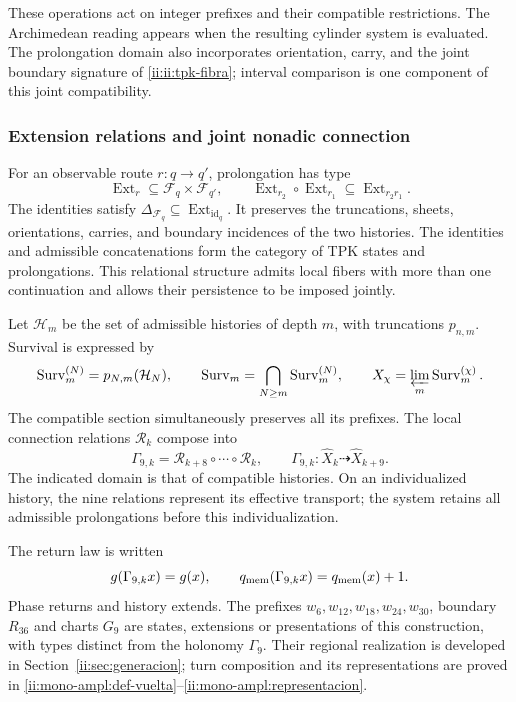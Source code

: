 These operations act on integer prefixes and their compatible
restrictions. The Archimedean reading appears when the resulting
cylinder system is evaluated. The prolongation domain also incorporates
orientation, carry, and the joint boundary signature of
\eqref{ii:ii:tpk-fibra}; interval comparison is one component of
this joint compatibility.

\subsubsection{Extension relations and joint nonadic connection}

For an observable route \(r:q\to q'\), prolongation has type
\[
 \operatorname{Ext}_r\subseteq\mathcal F_q\times\mathcal F_{q'},
 \qquad
 \operatorname{Ext}_{r_2}\circ\operatorname{Ext}_{r_1}
 \subseteq\operatorname{Ext}_{r_2r_1}.
\]
The identities satisfy
\(\Delta_{\mathcal F_q}\subseteq
\operatorname{Ext}_{\operatorname{id}_q}\).
It preserves the truncations, sheets, orientations, carries, and
boundary incidences of the two histories. The identities and
admissible concatenations form the category of TPK states and prolongations.
This relational structure admits local fibers with more than one
continuation and allows their persistence to be imposed jointly.

Let \(\mathcal H_m\) be the set of admissible histories of depth
\(m\), with truncations \(p_{n,m}\). Survival is expressed by
\[
 \operatorname{Surv}_m^{(N)}=p_{N,m}(\mathcal H_N),\qquad
 \operatorname{Surv}_m=\bigcap_{N\geq m}
 \operatorname{Surv}_m^{(N)},\qquad
 X_\chi=\varprojlim_m\operatorname{Surv}_m^{(\chi)}.
\]
The compatible section simultaneously preserves all its prefixes. The
local connection relations \(\mathcal R_k\) compose into
\begin{equation}
 \Gamma_{9,k}=\mathcal R_{k+8}\circ\cdots\circ\mathcal R_k,\qquad
 \Gamma_{9,k}:\widehat X_k\dashrightarrow\widehat X_{k+9}.
 \label{ii:ii:tpk-holonomia}
\end{equation}
The indicated domain is that of compatible histories. On an individualized
history, the nine relations represent its effective transport;
the system retains all admissible prolongations before this
individualization.

The return law is written
\[
 g(\Gamma_{9,k}x)=g(x),\qquad
 q_{\rm mem}(\Gamma_{9,k}x)=q_{\rm mem}(x)+1.
\]
Phase returns and history extends. The prefixes \(w_6,w_{12},w_{18},w_{24},w_{30}\), boundary \(R_{36}\) and charts \(G_9\) are states, extensions or presentations of this construction, with types distinct from the holonomy \(\Gamma_9\). Their regional realization is developed in Section~\ref{ii:sec:generacion}; turn composition and its representations are proved in \ref{ii:mono-ampl:def-vuelta}--\ref{ii:mono-ampl:representacion}.

